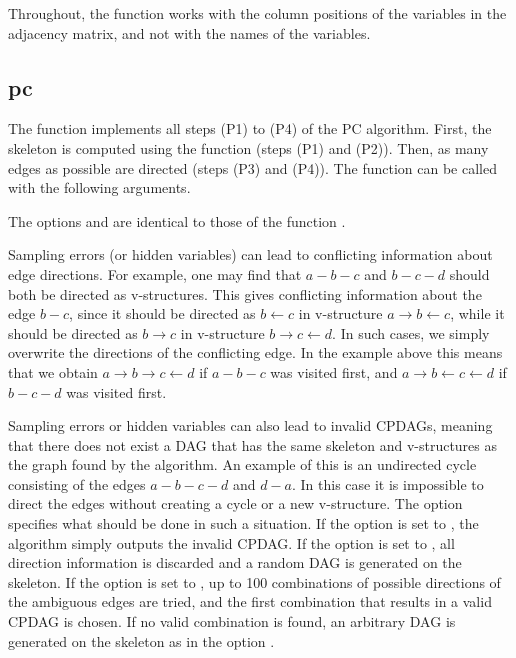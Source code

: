 \documentclass[article]{jss}
\begin{document}
Throughout, the function works with the column positions of the
variables in the adjacency matrix, and not with the names of the variables.

\subsection{pc} \label{sec:pc} 

The function  implements all steps (P1) to (P4) of the PC
algorithm. First, the skeleton is computed using the function
 (steps (P1) and (P2)). Then, as many edges as possible are
directed (steps (P3) and (P4)). The function can be called with the
following arguments.

     
The options  and  are identical to those of the
function .

Sampling errors (or hidden variables) can lead to conflicting information
about edge directions. For example, one may find that $a-b-c$ and $b-c-d$
should both be directed as v-structures.  This gives conflicting
information about the edge $b-c$, since it should be directed as $b
\leftarrow c$ in v-structure $a \rightarrow b \leftarrow c$, while it
should be directed as $b \rightarrow c$ in v-structure $b \rightarrow c
\leftarrow d$. In such cases, we simply overwrite the directions of the
conflicting edge. In the example above this means that we obtain $a
\rightarrow b \rightarrow c \leftarrow d$ if $a-b-c$ was visited first, and
$a \rightarrow b \leftarrow c \leftarrow d$ if $b-c-d$ was visited first.

Sampling errors or hidden variables can also lead to invalid CPDAGs,
meaning that there does not exist a DAG that has the same skeleton and
v-structures as the graph found by the algorithm. An example of this is an
undirected cycle consisting of the edges $a-b-c-d$ and $d-a$. In this case it
is impossible to direct the edges without creating a cycle or a new
v-structure. The option  specifies what should be done in such a
situation. If the option is set to , the algorithm simply
outputs the invalid CPDAG. If the option is set to , all direction
information is discarded and a random DAG is generated on the skeleton. If
the option is set to , up to 100 combinations of possible
directions of the ambiguous edges are tried, and the first combination that
results in a valid CPDAG is chosen. If no valid combination is found, an
arbitrary DAG is generated on the skeleton as in the option .
\end{document}
